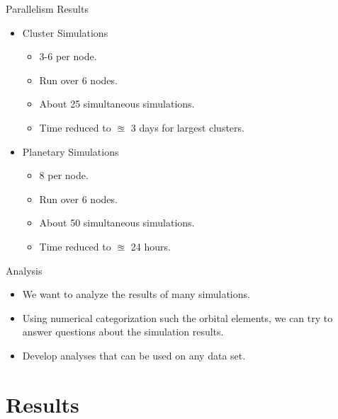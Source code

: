 \documentclass{beamer}
\begin{document}
\begin{frame}{Parallelism Results}
    \begin{itemize}
        \item Cluster Simulations
            \begin{itemize}
                \item 3-6 per node.
                \item Run over 6 nodes.
                \item About 25 simultaneous simulations.
                \item Time reduced to $\approxeq$ 3 days for largest clusters.
            \end{itemize}
        \item Planetary Simulations
            \begin{itemize}
                \item 8 per node.
                \item Run over 6 nodes.
                \item About 50 simultaneous simulations.
                \item Time reduced to $\approxeq$ 24 hours.
            \end{itemize}
    \end{itemize}
\end{frame}


\begin{frame}{Analysis}
    \begin{itemize}
        \item We want to analyze the results of many
            simulations.
        \item Using numerical categorization such the orbital elements,
            we can try to answer questions about the simulation results.
        \item Develop analyses that can be used on any data set.
    \end{itemize}
\end{frame}

\section{Results}
\end{document}
